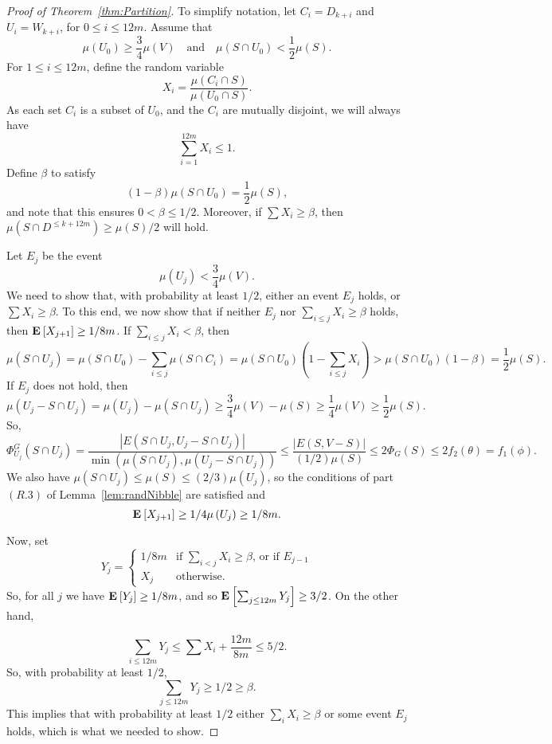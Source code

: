 \documentclass[11pt]{article}
\def\intersect{\cap}
\def\expec#1#2{\mbox{\bf E}_{#1}\left[ #2 \right]}
\def\sizeof#1{\left|#1  \right|}
\def\intersect{\cap}
\def\conduc#1#2{\Phi_{#1}\left(#2  \right)}
\def\conducin#1#2{\Phi^{G}_{#1}\left(#2  \right)}
\def\vol#1{\mu \left(#1  \right)}
\begin{document}
\begin{proof}[Proof of Theorem~\ref{thm:Partition}]
To simplify notation, let $C_{i} = D_{k+i}$ and $U_{i} = W_{k+i}$,
  for $0 \leq i \leq  12 m$.
Assume that
\[
\vol{U_{0}} \geq \frac{3}{4} \vol{V}
\quad \text{and} \quad 
\vol{S \intersect U_{0}} < \frac{1}{2} \vol{S}.
\]
For $1 \leq i \leq 12 m$, define the random variable
\[
  X_{i} = \frac{\vol{C_{i} \intersect S}}{\vol{U_{0} \intersect S}}.
\]
As each set $C_{i}$ is a subset of $U_{0}$, and the $C_{i}$ are mutually
  disjoint, we will always have
\[
  \sum_{i = 1}^{12m} X_{i} \leq 1.
\]
Define $\beta$ to satisfy
\[
  (1-\beta) \vol{S \intersect U_{0}} = \frac{1}{2} \vol{S},
\]
and note that this ensures $0 < \beta \leq 1/2$.
Moreover, if $\sum X_{i} \geq \beta$, then 
  $\vol{S \intersect D^{\leq k+12m}} \geq \vol{S}/2$
  will hold.

Let $E_{j}$  be the event
\[
\vol{U_{j}} < \frac{3}{4} \vol{V}.
\]
We need to show that, with probability at least $1/2$, either an
  event $E_{j}$ holds, or $\sum X_{i} \geq \beta$.
To this end, we now show that if neither $E_{j}$
  nor $\sum_{i \leq j} X_{i} \geq \beta$ holds,
  then $\expec{}{X_{j+1}} \geq 1/8 m$.
If $\sum_{i \leq j} X_{i} < \beta$, then
\[
\vol{S \intersect U_{j}}
= 
\vol{S \intersect U_{0}}
-
\sum_{i \leq j} \vol{S \intersect C_{i}}
=
\vol{S \intersect U_{0}}
\left(1 - \sum_{i \leq j} X_{i} \right)
>
\vol{S \intersect U_{0}} (1 - \beta )
= 
\frac{1}{2} \vol{S}.
\]
If $E_{j}$ does not hold, then
\[
  \vol{U_{j} - S \intersect U_{j}}
= 
  \vol{U_{j}} - \vol{S \intersect U_{j}}
\geq 
\frac{3}{4} \vol{V} - \vol{S}
\geq 
\frac{1}{4} \vol{V}
\geq 
\frac{1}{2} \vol{S}.
\]
So,
\[
\conducin{U_{j}}{S \intersect U_{j}}
= 
\frac{
  \sizeof{E (S \intersect U_{j}, U_{j} - S \intersect U_{j})}
}{
 \min \left(\vol{S \intersect U_{j}}, \vol{U_{j} - S \intersect U_{j}} \right)
}
\leq 
\frac{
  \sizeof{E (S , V - S)}
}{
  (1/2) \vol{S}
}
\leq 
2 \conduc{G}{S}
\leq 
2 f_{2} (\theta)
=
f_{1} (\phi).
\]
We also have $\vol{S \intersect U_{j}} \leq \vol{S} \leq (2/3) \vol{U_{j}}$,
 so the conditions of 
 part $(R.3)$ of Lemma~\ref{lem:randNibble} are satisfied and
\[
  \expec{}{X_{j+1}} \geq 1 / 4 \vol{U_{j}} \geq 1 / 8 m.
\]

Now, set 
\[
  Y_{j} = 
\begin{cases}
1 / 8m & \text{if $\sum_{i < j} X_{i} \geq \beta$, or if $E_{j-1}$}          
\\
X_{j} & \text{otherwise}.
\end{cases}
\]
So, for all $j$ we have $\expec{}{Y_{j}} \geq 1 / 8m$, 
  and so $\expec{}{\sum_{j \leq 12 m} Y_{j}} \geq 3/2$.
On the other hand,
  
\[
\sum_{i \leq 12 m} Y_{j} \leq \sum X_{i} + \frac{12 m}{8 m} \leq 5/2.
\]
So, with probability at least $1/2$, 
\[
  \sum_{j \leq 12 m} Y_{j} \geq 1/2 \geq \beta .
\]
This implies that with probability at least $1/2$ either
  $\sum_{i} X_{i} \geq \beta$ or some event $E_{j}$ holds,
  which is what we needed to show.
\end{proof}





\end{document}
